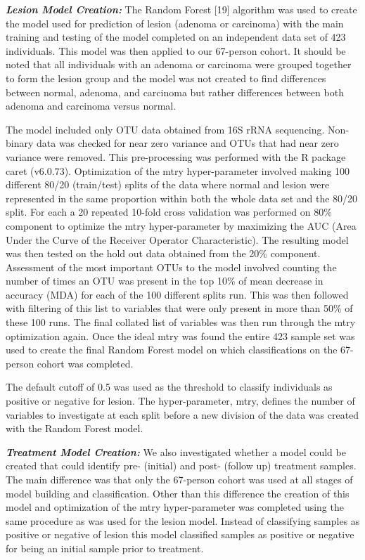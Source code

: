 \documentclass[12pt,]{article}
\begin{document}
\textbf{\emph{Lesion Model Creation:}} The Random Forest {[}19{]}
algorithm was used to create the model used for prediction of lesion
(adenoma or carcinoma) with the main training and testing of the model
completed on an independent data set of 423 individuals. This model was
then applied to our 67-person cohort. It should be noted that all
individuals with an adenoma or carcinoma were grouped together to form
the lesion group and the model was not created to find differences
between normal, adenoma, and carcinoma but rather differences between
both adenoma and carcinoma versus normal.

The model included only OTU data obtained from 16S rRNA sequencing.
Non-binary data was checked for near zero variance and OTUs that had
near zero variance were removed. This pre-processing was performed with
the R package caret (v6.0.73). Optimization of the mtry hyper-parameter
involved making 100 different 80/20 (train/test) splits of the data
where normal and lesion were represented in the same proportion within
both the whole data set and the 80/20 split. For each a 20 repeated
10-fold cross validation was performed on 80\% component to optimize the
mtry hyper-parameter by maximizing the AUC (Area Under the Curve of the
Receiver Operator Characteristic). The resulting model was then tested
on the hold out data obtained from the 20\% component. Assessment of the
most important OTUs to the model involved counting the number of times
an OTU was present in the top 10\% of mean decrease in accuracy (MDA)
for each of the 100 different splits run. This was then followed with
filtering of this list to variables that were only present in more than
50\% of these 100 runs. The final collated list of variables was then
run through the mtry optimization again. Once the ideal mtry was found
the entire 423 sample set was used to create the final Random Forest
model on which classifications on the 67-person cohort was completed.

The default cutoff of 0.5 was used as the threshold to classify
individuals as positive or negative for lesion. The hyper-parameter,
mtry, defines the number of variables to investigate at each split
before a new division of the data was created with the Random Forest
model.

\textbf{\emph{Treatment Model Creation:}} We also investigated whether a
model could be created that could identify pre- (initial) and post-
(follow up) treatment samples. The main difference was that only the
67-person cohort was used at all stages of model building and
classification. Other than this difference the creation of this model
and optimization of the mtry hyper-parameter was completed using the
same procedure as was used for the lesion model. Instead of classifying
samples as positive or negative of lesion this model classified samples
as positive or negative for being an initial sample prior to treatment.
\end{document}
